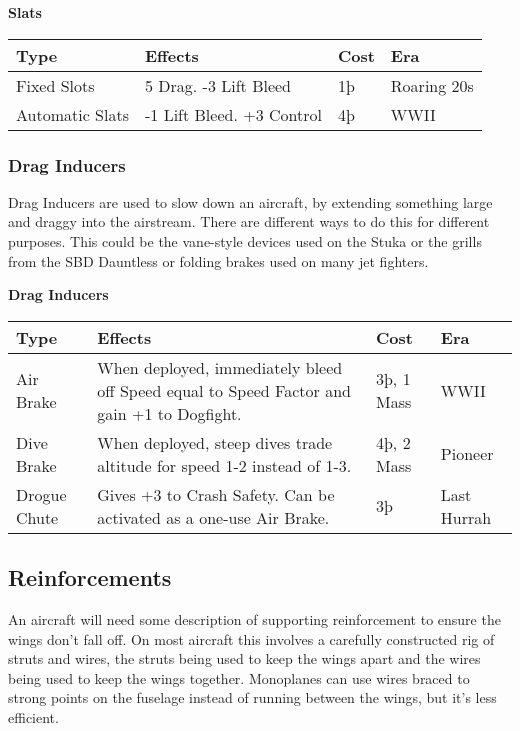 \documentclass{article}
\begin{document}
\textbf{Slats}

\begin{tabular}{|l|l|l|l|}
  \hline
  Type            & Effects                   & Cost & Era         \\\hline
  Fixed Slots     & 5 Drag. -3 Lift Bleed     & 1þ   & Roaring 20s \\\hline
  Automatic Slats & -1 Lift Bleed. +3 Control & 4þ   & WWII        \\\hline
\end{tabular}

\subsubsection{Drag Inducers}
\label{_Drag_Inducers}

Drag Inducers are used to slow down an aircraft, by extending something
large and draggy into the airstream. There are different ways to do this
for different purposes. This could be the vane-style devices used on the
Stuka or the grills from the SBD Dauntless or folding brakes used on
many jet fighters.

\textbf{Drag Inducers}

\begin{tabular}{|l|l|l|l|}
  \hline
  Type                            & Effects                                                   & Cost        & Era \\\hline
  Air Brake                       & When deployed, immediately bleed off Speed equal to Speed
  Factor and gain +1 to Dogfight. & 3þ, 1 Mass                                                & WWII              \\\hline
  Dive Brake                      & When deployed, steep dives trade altitude for speed 1-2
  instead of 1-3.                 & 4þ, 2 Mass                                                & Pioneer           \\\hline
  Drogue Chute                    & Gives +3 to Crash Safety. Can be activated as a one-use
  Air Brake.                      & 3þ                                                        & Last Hurrah       \\\hline
\end{tabular}

\subsection{Reinforcements}
\label{_Reinforcement}

An aircraft will need some description of supporting reinforcement to
ensure the wings don't fall off. On most aircraft this involves a
carefully constructed rig of struts and wires, the struts being used to
keep the wings apart and the wires being used to keep the wings
together. Monoplanes can use wires braced to strong points on the
fuselage instead of running between the wings, but it's less efficient.
\end{document}
